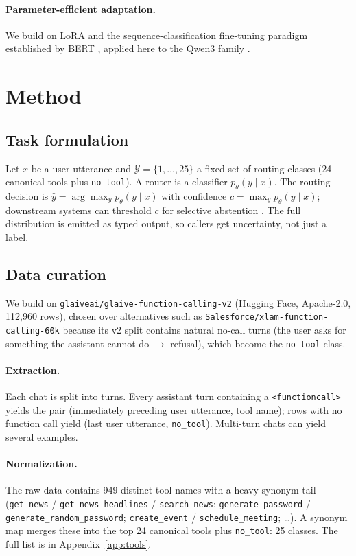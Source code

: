 \documentclass{article}
\begin{document}
\paragraph{Parameter-efficient adaptation.}
We build on LoRA \citep{hu2022lora} and the sequence-classification
fine-tuning paradigm established by BERT \citep{devlin2019bert}, applied here
to the Qwen3 family \citep{qwen2025report}.

\section{Method}
\label{sec:method}

\subsection{Task formulation}
\label{sec:task}

Let $x$ be a user utterance and $\mathcal{Y} = \{1, \dots, 25\}$ a fixed set
of routing classes (24 canonical tools plus \texttt{no\_tool}). A router is a
classifier $p_\theta(y \mid x)$. The routing decision is
$\hat{y} = \arg\max_y p_\theta(y \mid x)$ with confidence
$c = \max_y p_\theta(y \mid x)$; downstream systems can threshold $c$ for
selective abstention \citep{geifman2017selective}. The full distribution is
emitted as typed output, so callers get uncertainty, not just a label.

\subsection{Data curation}
\label{sec:data}

We build on \texttt{glaiveai/glaive-function-calling-v2} \citep{glaive2024}
(Hugging Face, Apache-2.0, 112,960 rows), chosen over alternatives such as
\texttt{Salesforce/xlam-function-calling-60k} because its v2 split contains
natural no-call turns (the user asks for something the assistant cannot do
$\to$ refusal), which become the \texttt{no\_tool} class.

\paragraph{Extraction.} Each chat is split into turns. Every assistant turn
containing a \texttt{<functioncall>} yields the pair (immediately preceding
user utterance, tool name); rows with no function call yield (last user
utterance, \texttt{no\_tool}). Multi-turn chats can yield several examples.

\paragraph{Normalization.} The raw data contains 949 distinct tool names with
a heavy synonym tail (\texttt{get\_news} / \texttt{get\_news\_headlines} /
\texttt{search\_news}; \texttt{generate\_password} /
\texttt{generate\_random\_password}; \texttt{create\_event} /
\texttt{schedule\_meeting}; \dots). A synonym map merges these into the top
24 canonical tools plus \texttt{no\_tool}: 25 classes. The full list is in
Appendix~\ref{app:tools}.
\end{document}
